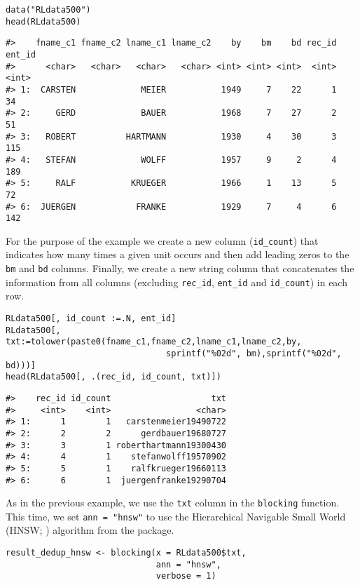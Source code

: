\begin{verbatim}
data("RLdata500")
head(RLdata500)
\end{verbatim}

\begin{verbatim}
#>    fname_c1 fname_c2 lname_c1 lname_c2    by    bm    bd rec_id ent_id
#>      <char>   <char>   <char>   <char> <int> <int> <int>  <int>  <int>
#> 1:  CARSTEN             MEIER           1949     7    22      1     34
#> 2:     GERD             BAUER           1968     7    27      2     51
#> 3:   ROBERT          HARTMANN           1930     4    30      3    115
#> 4:   STEFAN             WOLFF           1957     9     2      4    189
#> 5:     RALF           KRUEGER           1966     1    13      5     72
#> 6:  JUERGEN            FRANKE           1929     7     4      6    142
\end{verbatim}

For the purpose of the example we create a new column (\texttt{id\_count}) that indicates
how many times a given unit occurs and then add leading zeros to the \texttt{bm} and \texttt{bd}
columns. Finally, we create a new string column that concatenates the
information from all columns (excluding \texttt{rec\_id}, \texttt{ent\_id} and
\texttt{id\_count}) in each row.

\begin{verbatim}
RLdata500[, id_count :=.N, ent_id]
RLdata500[, txt:=tolower(paste0(fname_c1,fname_c2,lname_c1,lname_c2,by,
                                sprintf("%02d", bm),sprintf("%02d", bd)))]
head(RLdata500[, .(rec_id, id_count, txt)])
\end{verbatim}

\begin{verbatim}
#>    rec_id id_count                    txt
#>     <int>    <int>                 <char>
#> 1:      1        1   carstenmeier19490722
#> 2:      2        2      gerdbauer19680727
#> 3:      3        1 roberthartmann19300430
#> 4:      4        1    stefanwolff19570902
#> 5:      5        1    ralfkrueger19660113
#> 6:      6        1  juergenfranke19290704
\end{verbatim}

As in the previous example, we use the \texttt{txt} column in the \texttt{blocking}
function. This time, we set \texttt{ann\ =\ "hnsw"} to use the Hierarchical
Navigable Small World (HNSW; \citet{malkov2018efficient}) algorithm from the 
package.

\begin{verbatim}
result_dedup_hnsw <- blocking(x = RLdata500$txt,
                              ann = "hnsw",
                              verbose = 1)
\end{verbatim}

